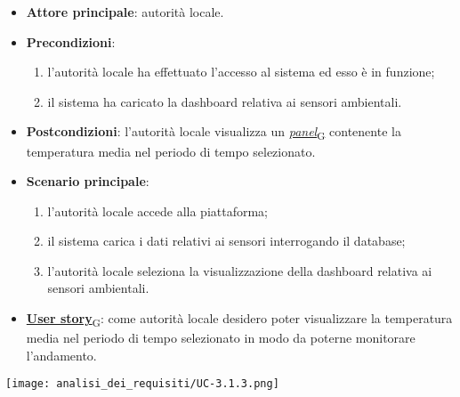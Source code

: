 \begin{itemize}
	\item \textbf{Attore principale}: autorità locale.
	\item \textbf{Precondizioni}:
	      \begin{enumerate}
		      \item l'autorità locale ha effettuato l'accesso al sistema ed esso è in funzione;
		      \item il sistema ha caricato la dashboard relativa ai sensori ambientali.
	      \end{enumerate}
	\item \textbf{Postcondizioni}: l'autorità locale visualizza un \href{https://7last.github.io/docs/pb/documentazione-interna/glossario\#panel}{\textit{panel}\textsubscript{G}} contenente la temperatura media nel periodo di tempo selezionato.
	\item \textbf{Scenario principale}:
	      \begin{enumerate}
		      \item l'autorità locale accede alla piattaforma;
		      \item il sistema carica i dati relativi ai sensori interrogando il database;
		      \item l'autorità locale seleziona la visualizzazione della dashboard relativa ai sensori ambientali.
	      \end{enumerate}
	\item \href{https://7last.github.io/docs/pb/documentazione-interna/glossario\#user-story}{\textbf{User story}\textsubscript{G}}: come autorità locale desidero poter visualizzare la temperatura media nel periodo di tempo selezionato
	      in modo da poterne monitorare l'andamento.
\end{itemize}
\begin{center}
	\texttt{[image: analisi\_dei\_requisiti/UC-3.1.3.png]}
\end{center}


